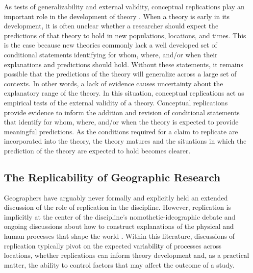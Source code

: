 \documentclass[]{interact}
\theoremstyle{plain}%
\theoremstyle{definition}
\theoremstyle{remark}
\begin{document}
As tests of generalizability and external validity, conceptual replications play an important role in the development of theory \citep{earp2015, haig2022, irvine2021}.
When a theory is early in its development, it is often unclear whether a researcher should expect the predictions of that theory to hold in new populations, locations, and times.
This is the case because new theories commonly lack a well developed set of conditional statements identifying for whom, where, and/or when their explanations and predictions should hold. 
Without these statements, it remains possible that the predictions of the theory will generalize across a large set of contexts. 
In other words, a lack of evidence causes uncertainty about the explanatory range of the theory.
In this situation, conceptual replications act as empirical tests of the external validity of a theory. 
Conceptual replications provide evidence to inform the addition and revision of conditional statements that identify for whom, where, and/or when the theory is expected to provide meaningful predictions.
As the conditions required for a claim to replicate are incorporated into the theory, the theory matures and the situations in which the prediction of the theory are expected to hold becomes clearer.

\subsection*{The Replicability of Geographic Research}
Geographers have arguably never formally and explicitly held an extended discussion of the role of replication in the discipline.
However, replication is implicitly at the center of the discipline's nomothetic-ideographic debate \citep{kedron2022replication, sui2021reproducibility} and ongoing discussions about how to construct explanations of the physical and human processes that shape the world \citep[see][]{harvey1969, inkpen2013science, miller2015data, sayer1992method, yeung2019rethinking, yeung2023theory}. 
Within this literature, discussions of replication typically pivot on the expected variability of processes across locations, whether replications can inform theory development and, as a practical matter, the ability to control factors that may affect the outcome of a study. 
\end{document}
